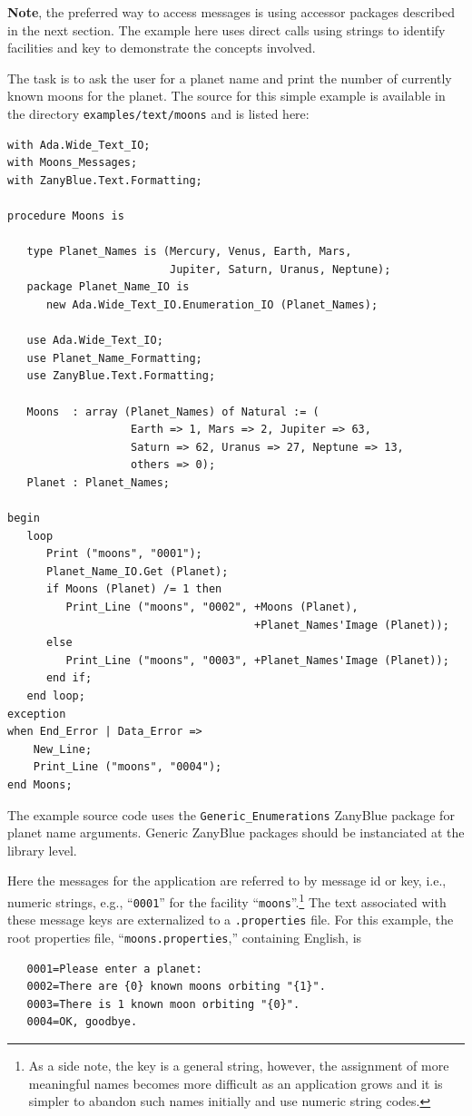 \textbf{Note}, the preferred way to access messages is using accessor
packages described in the next section.   The example here uses direct
calls using strings to identify facilities and key to demonstrate the
concepts involved.

The task is to ask the user for a planet name and print the number of currently
known moons for the planet.  The source for this simple example
is available in the directory \texttt{examples/text/moons} and is listed here:
\begin{xmpl}
\begin{verbatim}
with Ada.Wide_Text_IO;
with Moons_Messages;
with ZanyBlue.Text.Formatting;

procedure Moons is

   type Planet_Names is (Mercury, Venus, Earth, Mars,
                         Jupiter, Saturn, Uranus, Neptune);
   package Planet_Name_IO is
      new Ada.Wide_Text_IO.Enumeration_IO (Planet_Names);

   use Ada.Wide_Text_IO;
   use Planet_Name_Formatting;
   use ZanyBlue.Text.Formatting;

   Moons  : array (Planet_Names) of Natural := (
                   Earth => 1, Mars => 2, Jupiter => 63,
                   Saturn => 62, Uranus => 27, Neptune => 13,
                   others => 0);
   Planet : Planet_Names;

begin
   loop
      Print ("moons", "0001");
      Planet_Name_IO.Get (Planet);
      if Moons (Planet) /= 1 then
         Print_Line ("moons", "0002", +Moons (Planet),
                                      +Planet_Names'Image (Planet));
      else
         Print_Line ("moons", "0003", +Planet_Names'Image (Planet));
      end if;
   end loop;
exception
when End_Error | Data_Error =>
    New_Line;
    Print_Line ("moons", "0004");
end Moons;
\end{verbatim}
\end{xmpl}
The example source code uses the \texttt{Generic\_Enumerations} ZanyBlue
package for planet name arguments.  Generic ZanyBlue packages should
be instanciated at the library level.

Here the messages for the application are referred to by message id or
key, i.e., numeric strings, e.g., ``\texttt{0001}'' for the facility
``\texttt{moons}''.\footnote{As a side note, the key is a general string,
however, the assignment of more meaningful names becomes more difficult
as an application grows and it is simpler to abandon such names initially
and use numeric string codes.}
The text associated with these message keys are externalized to a
\texttt{.properties} file.  For this example, the root properties file,
``\texttt{moons.properties},'' containing English, is
\begin{xmpl}
\begin{verbatim}
   0001=Please enter a planet:
   0002=There are {0} known moons orbiting "{1}".
   0003=There is 1 known moon orbiting "{0}".
   0004=OK, goodbye.
\end{verbatim}
\end{xmpl}

